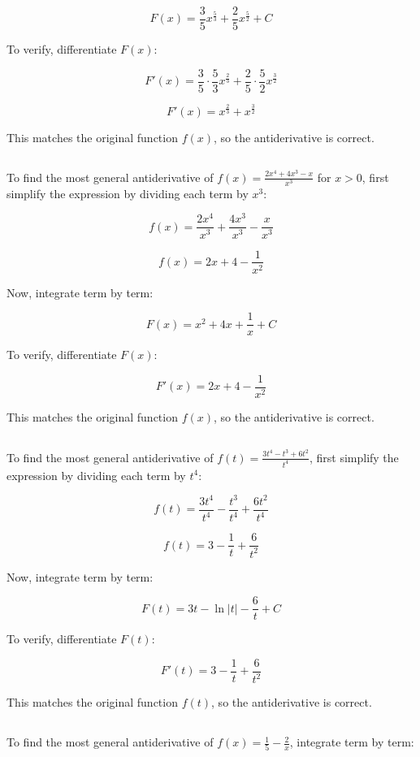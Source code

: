 \documentclass{article}
\begin{document}
\[
F(x) = \frac{3}{5} x^{\frac{5}{3}} + \frac{2}{5} x^{\frac{5}{2}} + C
\]

To verify, differentiate \( F(x) \):

\[
F'(x) = \frac{3}{5} \cdot \frac{5}{3} x^{\frac{2}{3}} + \frac{2}{5} \cdot \frac{5}{2} x^{\frac{3}{2}}
\]

\[
F'(x) = x^{\frac{2}{3}} + x^{\frac{3}{2}}
\]

This matches the original function \( f(x) \), so the antiderivative is correct.
\subsection{}
To find the most general antiderivative of \( f(x) = \frac{2x^4 + 4x^3 - x}{x^3} \) for \( x > 0 \), first simplify the expression by dividing each term by \( x^3 \):

\[
f(x) = \frac{2x^4}{x^3} + \frac{4x^3}{x^3} - \frac{x}{x^3}
\]

\[
f(x) = 2x + 4 - \frac{1}{x^2}
\]

Now, integrate term by term:


\[
F(x) = x^2 + 4x + \frac{1}{x} + C
\]

To verify, differentiate \( F(x) \):

\[
F'(x) = 2x + 4 - \frac{1}{x^2}
\]

This matches the original function \( f(x) \), so the antiderivative is correct.
\subsection{}
To find the most general antiderivative of \( f(t) = \frac{3t^4 - t^3 + 6t^2}{t^4} \), first simplify the expression by dividing each term by \( t^4 \):

\[
f(t) = \frac{3t^4}{t^4} - \frac{t^3}{t^4} + \frac{6t^2}{t^4}
\]

\[
f(t) = 3 - \frac{1}{t} + \frac{6}{t^2}
\]

Now, integrate term by term:

\[
F(t) = 3t - \ln|t| - \frac{6}{t} + C
\]

To verify, differentiate \( F(t) \):

\[
F'(t) = 3 - \frac{1}{t} + \frac{6}{t^2}
\]

This matches the original function \( f(t) \), so the antiderivative is correct.
\subsection{}
To find the most general antiderivative of \( f(x) = \frac{1}{5} - \frac{2}{x} \), integrate term by term:
\end{document}
